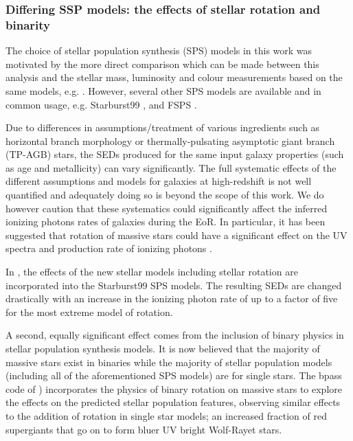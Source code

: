 \subsubsection{Differing SSP models: the effects of stellar rotation and binarity}
The choice of \citet{Bruzual:2003ckb} stellar population synthesis (SPS) models in this work was motivated by the more direct comparison which can be made between this analysis and the stellar mass, luminosity and colour measurements based on the same models, e.g. \citet{2012ApJ...756..164F,Duncan:2014gh}. However, several other SPS models are available and in common usage, e.g. Starburst99 \citep{Leitherer:1999jt}, \citet{Maraston:2005er} and FSPS \citep{Conroy:2009ks,Conroy:2009ja}.

Due to differences in assumptions/treatment of various ingredients such as horizontal branch morphology or thermally-pulsating asymptotic giant branch (TP-AGB) stars, the SEDs produced for the same input galaxy properties (such as age and metallicity) can vary significantly. The full systematic effects of the different assumptions and models for galaxies at high-redshift is not well quantified and adequately doing so is beyond the scope of this work. We do however caution that these systematics could significantly affect the inferred ionizing photons rates of galaxies during the EoR. In particular, it has been suggested that rotation of massive stars could have a significant effect on the UV spectra and production rate of ionizing photons \citep{Vazquez:2007jt}.

In \citet{Leitherer:2014ia}, the effects of the new stellar models including stellar rotation \citep{Ekstrom:2012ke} are incorporated into the Starburst99 SPS models. The resulting SEDs are changed drastically with an increase in the ionizing photon rate of up to a factor of five for the most extreme model of rotation.

A second, equally significant effect comes from the inclusion of binary physics in stellar population synthesis models. It is now believed that the majority of massive stars exist in binaries \citep{Sana:2012gu,Sana:2013hh,2015AJ....149...26A} while the majority of stellar population models (including all of the aforementioned SPS models) are for single stars. The {\sc bpass} code of \citet{Eldridge:2009bi,Eldridge:2011kg}) incorporates the physics of binary rotation on massive stars to explore the effects on the predicted stellar population features, observing similar effects to the addition of rotation in single star models; an increased fraction of red supergiants that go on to form bluer UV bright Wolf-Rayet stars.

